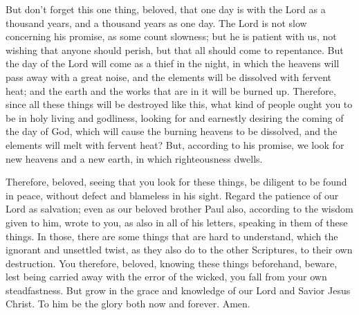  But don't forget this one thing, beloved, that one day is
with the Lord as a thousand years, and a thousand years as one day.
 The Lord is not slow concerning his promise, as some count
slowness; but he is patient with us, not wishing that anyone should
perish, but that all should come to repentance.  But the
day of the Lord will come as a thief in the night, in which the heavens
will pass away with a great noise, and the elements will be dissolved
with fervent heat; and the earth and the works that are in it will be
burned up.  Therefore, since all these things will be
destroyed like this, what kind of people ought you to be in holy living
and godliness,  looking for and earnestly desiring the
coming of the day of God, which will cause the burning heavens to be
dissolved, and the elements will melt with fervent heat? 
But, according to his promise, we look for new heavens and a new earth,
in which righteousness dwells.

 Therefore, beloved, seeing that you look for these things,
be diligent to be found in peace, without defect and blameless in his
sight.  Regard the patience of our Lord as salvation; even
as our beloved brother Paul also, according to the wisdom given to him,
wrote to you,  as also in all of his letters, speaking in
them of these things. In those, there are some things that are hard to
understand, which the ignorant and unsettled twist, as they also do to
the other Scriptures, to their own destruction.  You
therefore, beloved, knowing these things beforehand, beware, lest being
carried away with the error of the wicked, you fall from your own
steadfastness.  But grow in the grace and knowledge of our
Lord and Savior Jesus Christ. To him be the glory both now and forever.
Amen.
